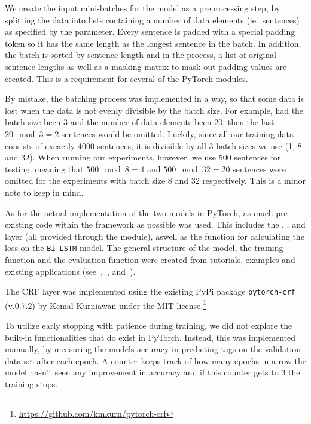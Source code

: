 We create the input mini-batches for the model as a preprocessing step, by
splitting the data into lists containing a number of data elements (ie.\
sentences) as specified by the  parameter. Every sentence is
padded with a special padding token \code{`<PAD>'} so it has the same length as
the longest sentence in the batch. In addition, the batch is sorted by sentence
length and in the process, a list of original sentence lengths as well as a
masking matrix to mask out padding values are created. This is a requirement for
several of the PyTorch modules.

By mistake, the batching process was implemented in a way, so that some data is
lost when the data is not evenly divisible by the batch size. For example, had
the batch size been 3 and the number of data elements been 20, then the last
$20\mod3 = 2$ sentences would be omitted. Luckily, since all our training data
consists of excactly 4000 sentences, it is divisible by all 3 batch sizes we use
(1, 8 and 32). When running our experiments, however, we use 500 sentences for
testing, meaning that $500\mod8 = 4$ and $500\mod32 = 20$ sentences were omitted
for the experiments with batch size 8 and 32 respectively. This is a minor note
to keep in mind.

As for the actual implementation of the two models in PyTorch, as much
pre-existing code within the framework as possible was used. This includes the
\code{Embedding}, \code{Dropout}, \code{LSTM} and \code{Linear} layer (all
provided through the \code{torch.nn} module), aswell as the
 function for calculating the loss on the
\texttt{Bi-LSTM} model. The general structure of the model, the training
function and the evaluation function were created from tutorials, examples and
existing applications (see~\cite{pytorch2017lstm},~\cite{yang2018ncrf},
and~\cite{pytorch2018examples}).

The CRF layer was implemented using the existing PyPi package
\texttt{pytorch-crf} (v.0.7.2) by Kemal Kurniawan under the MIT
license.\footnote{\url{https://github.com/kmkurn/pytorch-crf}}

To utilize early stopping with patience during training, we did not explore the
built-in functionalities that do exist in PyTorch. Instead, this was implemented
manually, by measuring the models accuracy in predicting tags on the validation
data set after each epoch. A counter keeps track of how many epochs in a row the
model hasn't seen any improvement in accuracy and if this counter gets to 3 the
training stops.

